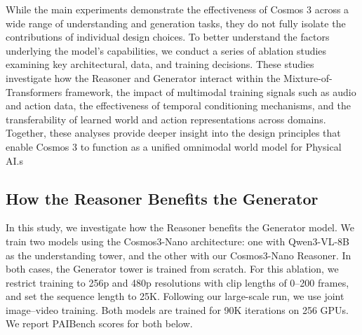 \documentclass{llmxive}
\providecommand{\roth}[1]{\rotatebox[origin=l]{90}{\small #1}}
\providecommand{\vraise}[1]{\raisebox{3.0em}{#1}}
\begin{document}
While the main experiments demonstrate the effectiveness of Cosmos 3 across a wide range of understanding and generation tasks, they do not fully isolate the contributions of individual design choices. To better understand the factors underlying the model's capabilities, we conduct a series of ablation studies examining key architectural, data, and training decisions. These studies investigate how the Reasoner and Generator interact within the Mixture-of-Transformers framework, the impact of multimodal training signals such as audio and action data, the effectiveness of temporal conditioning mechanisms, and the transferability of learned world and action representations across domains. Together, these analyses provide deeper insight into the design principles that enable Cosmos 3 to function as a unified omnimodal world model for Physical AI.s

\subsection{How the Reasoner Benefits the Generator}
In this study, we investigate how the Reasoner benefits the Generator model. We train two models using the Cosmos3-Nano architecture: one with Qwen3-VL-8B as the understanding tower, and the other with our Cosmos3-Nano Reasoner. In both cases, the Generator tower is trained from scratch. For this ablation, we restrict training to 256p and 480p resolutions with clip lengths of 0–200 frames, and set the sequence length to 25K. Following our large-scale run, we use joint image–video training. Both models are trained for 90K iterations on 256 GPUs. We report PAIBench scores for both below.

\renewcommand{\roth}[1]{\rotatebox[origin=l]{90}{\small #1}}

\renewcommand{\vraise}[1]{\raisebox{3.0em}{#1}}
\end{document}

